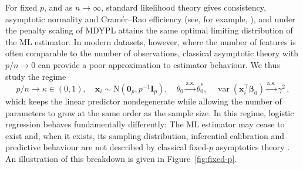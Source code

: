 \documentclass{article}
\DeclareMathOperator{\var}{var}
\theoremstyle{definition}
\newcommand*{\bb}{\boldsymbol}
\def\bx{\bb{x}}
\def\bbeta{\bb{\beta}}
\begin{document}
\begin{bibunit}
\noindent For fixed $p$, and as $n\to\infty$, standard likelihood theory gives
consistency, asymptotic normality and Cram\'er--Rao efficiency
(see, for example, \citealt{GOURIEROUX198183}),
and under the penalty scaling of
\citet[Section~3.3]{rigon+aliverti:2023} MDYPL 
attains the same optimal limiting distribution of the ML estimator.
In modern datasets, however, 
where the number of features is often comparable to the number of observations, 
classical asymptotic theory with $p/n\to0$ can provide a poor approximation to estimator behaviour.
We thus study the regime
\begin{equation}
\label{eq:proportional-regime-intro}
    p / n \to\kappa\in(0,1),
    \quad
    \bx_i\sim\mathrm N\left(\bb 0_p,p^{-1}\bb I_p\right), 
    \quad
    \theta_0\overset{\mathrm{a.s.}}{\longrightarrow}\theta_0^*,
    \quad
    \var(\bx_i^\top\bbeta_0)\overset{\mathrm{a.s.}}{\longrightarrow}\gamma^2\,,
\end{equation}
which keeps the linear predictor nondegenerate while allowing the number of
parameters to grow at the same order as the sample size.
In this regime, logistic regression behaves fundamentally differently: The
ML estimator may cease to exist \citep{candes+sur:2020} and, when it exists, its sampling
distribution, inferential calibration and predictive behaviour are not
described by classical fixed-$p$ asymptotics theory \citep{sur+candes:2019,sur+et+al:2019,zhao+etal:2022}. An illustration of this breakdown is given in Figure~\ref{fig:fixed-p}. 



\end{bibunit}
\end{document}
